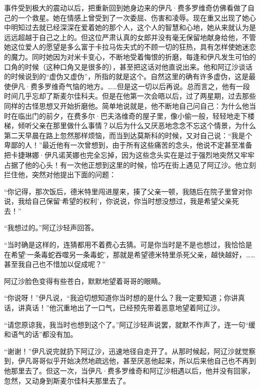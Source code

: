 事件受到极大的震动以后，把重新回到她身边来的伊凡·费多罗维奇仿佛看做了自己的一个救星。她在情感上曾受到了一次委屈、伤害和凌辱。现在重又出现了她心中明知过去就已经深深在爱着她的那个人，这个人的智慧和心地，她从来就认为是远远超越于自己之上的。但这位严肃认真的女郎并没有毫无保留地献身给他，不管她这位爱人的愿望是多么富于卡拉马佐夫式的不顾一切的狂热，具有怎样使她迷恋的魔力。同时她因为对米卡变心，不断地受着悔恨的折磨，每逢和伊凡发生可怕的口角的时候（这种口角又是很多的），甚至把这话对他直说出来。他和阿辽沙谈话的时候说到的“虚伪又虚伪”，所指的就是这个。自然这里的确有许多虚伪，这是最使伊凡·费多罗维奇气恼的地方。……但是这一切以后再说。总而言之，他有一段时间几乎忘却了斯麦尔佳科夫。但是在他第一次会晤以后，过了两星期，过去那些同样的古怪思想又开始折磨他。简单地说就是，他不断地自己问自己：为什么他当时在临出门的前夕，在费多尔·巴夫洛维奇的屋子里，像小偷一般，轻轻地走下楼梯，倾听父亲在那里做什么事情？以后为什么又厌恶地念念不忘这个情景，为什么第二天早晨在路上忽然那样烦恼，而当到达莫斯科的时候，又对自己说：“我是个卑鄙的人！”最近他有一次曾想到，由于所有这些痛苦的念头，他说不定甚至准备把卡捷琳娜·伊凡诺芙娜也完全忘掉，因为这些念头实在是过于强烈地突然又牢牢占据了他的心头！有一次他正想到这里的时候，恰巧在街上遇见了阿辽沙。他立刻拦住他，突然对他提出下面的问题：
\par “你记得，那次饭后，德米特里闯进屋来，揍了父亲一顿，我随后在院子里曾对你说，我给自己保留‘希望的权利’，你说说，你当时想没想过，我是希望父亲死去！”
\par “我想过的。”阿辽沙轻声回答。
\par “当时确是这样的，连猜都用不着费心去猜。可是你当时是不是也想过，我恰恰是在希望‘一条毒蛇吞噬另一条毒蛇’，那就是希望德米特里杀死父亲，越快越好，……甚至我自己也不惜加以促成呢？”
\par 阿辽沙脸色变得有些苍白，默默地望着哥哥的眼睛。
\par “你说呀！”伊凡说，“我迫切想知道你当时想的是什么？我一定要知道；你讲真话，讲真话！”他沉重地出了一口气，已经预先带着恶意地望着阿辽沙。
\par “请您原谅我，我当时也想到这个了。”阿辽沙轻声说罢，就默不作声了，连一句“缓和语气的话”都没有加。
\par “谢谢！”伊凡说完就扔下阿辽沙，迅速地径自走开了。从那时候起，阿辽沙就觉察到，伊凡哥哥似乎开始决然地疏远他，甚至厌恶他起来，所以后来他自己也不再到他那里去了。但这一次，当伊凡·费多罗维奇和阿辽沙相遇以后，他并没有回家，忽然，又动身到斯麦尔佳科夫那里去了。
